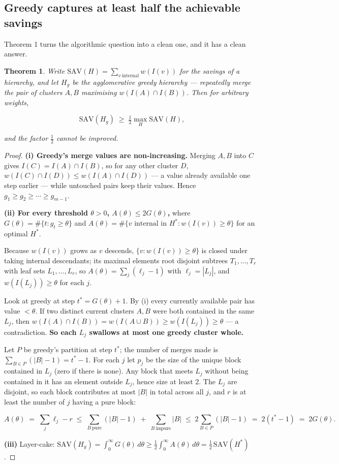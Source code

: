 \documentclass[11pt]{article}
\theoremstyle{plain}
\newtheorem{theorem}{Theorem}
\begin{document}
\subsection{Greedy captures at least half the achievable savings}

Theorem 1 turns the algorithmic question into a clean one, and it has a clean answer.

\begin{theorem}
Write $\mathrm{SAV}(H) = \sum_{v\ \mathrm{internal}} w(I(v))$ for the savings of a hierarchy, and let $H_g$ be the agglomerative greedy hierarchy --- repeatedly merge the pair of clusters $A,B$ maximising $w(I(A) \cap I(B))$. Then for arbitrary weights,

\[
\mathrm{SAV}(H_g) \;\ge\; \tfrac12 \max_H \mathrm{SAV}(H),
\]

and the factor $\tfrac12$ cannot be improved.
\end{theorem}
\begin{proof}
\textbf{(i) Greedy's merge values are non-increasing.} Merging $A,B$ into $C$ gives $I(C) = I(A)\cap I(B)$, so for any other cluster $D$, $w(I(C)\cap I(D)) \le w(I(A)\cap I(D))$ --- a value already available one step earlier --- while untouched pairs keep their values. Hence $g_1 \ge g_2 \ge \cdots \ge g_{m-1}$.

\textbf{(ii) For every threshold $\theta>0$, $A(\theta) \le 2G(\theta)$,} where $G(\theta) = \#\{t : g_t \ge \theta\}$ and $A(\theta) = \#\{v \text{ internal in } H^* : w(I(v)) \ge \theta\}$ for an optimal $H^*$.

Because $w(I(v))$ grows as $v$ descends, $\{v : w(I(v)) \ge \theta\}$ is closed under taking internal descendants; its maximal elements root disjoint subtrees $T_1,\dots,T_r$ with leaf sets $L_1,\dots,L_r$, so $A(\theta) = \sum_j (\ell_j - 1)$ with $\ell_j = |L_j|$, and $w(I(L_j)) \ge \theta$ for each $j$.

Look at greedy at step $t^{*} = G(\theta)+1$. By (i) every currently available pair has value $< \theta$. If two distinct current clusters $A,B$ were both contained in the same $L_j$, then $w(I(A)\cap I(B)) = w(I(A\cup B)) \ge w(I(L_j)) \ge \theta$ --- a contradiction. \textbf{So each $L_j$ swallows at most one greedy cluster whole.}

Let $P$ be greedy's partition at step $t^{*}$; the number of merges made is $\sum_{B\in P}(|B|-1) = t^{*}-1$. For each $j$ let $p_j$ be the size of the unique block contained in $L_j$ (zero if there is none). Any block that meets $L_j$ without being contained in it has an element outside $L_j$, hence size at least 2. The $L_j$ are disjoint, so each block contributes at most $|B|$ in total across all $j$, and $r$ is at least the number of $j$ having a pure block:

\[
A(\theta) \;=\; \sum_j \ell_j - r \;\le\; \sum_{B\ \mathrm{pure}} (|B|-1) \;+\; \sum_{B\ \mathrm{impure}} |B|
\;\le\; 2\sum_{B \in P}(|B|-1) \;=\; 2(t^{*}-1) \;=\; 2G(\theta).
\]

\textbf{(iii)} Layer-cake: $\mathrm{SAV}(H_g) = \int_0^\infty G(\theta)\,d\theta \ge \tfrac12\int_0^\infty A(\theta)\,d\theta = \tfrac12\,\mathrm{SAV}(H^*)$. 
\end{proof}
\end{document}
